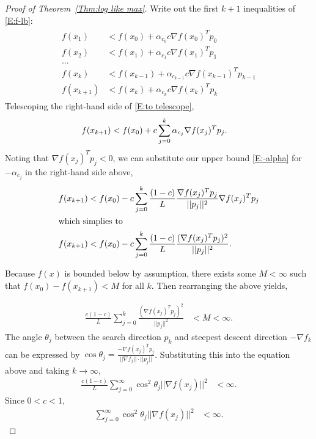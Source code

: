 \documentclass[oneside]{myumnStatThesis}
\begin{document}
\begin{proof}[Proof of Theorem~\ref{Thm:log like max}]
Write out the first $k+1$ inequalities of \eqref{E:f-lb}:
\begin{align}
\begin{split}
	f( x_1 ) &< f(x_0) + \alpha_{c_0} c \nabla f(x_0)^T p_0 \\
	f( x_2 ) &< f(x_1) + \alpha_{c_1} c \nabla f(x_1)^T p_1  \\
	\ldots  \\
	f( x_{k} ) &< f(x_{k-1}) + \alpha_{c_{k-1}} c \nabla f(x_{k-1})^T p_{k-1}  \\
	f( x_{k+1} ) &< f(x_k) + \alpha_{c_k} c \nabla f(x_k)^T p_k 
\end{split}
	\label{E:to telescope}
\end{align}
Telescoping the right-hand side of \eqref{E:to telescope},
\begin{align*}
	f( x_{k+1} ) &< f(x_0) + c \sum_{j=0}^{k} \alpha_{c_j} \nabla f(x_j)^T p_j. \notag
\end{align*}
Noting that $\nabla f(x_j)^T p_j < 0$, we can substitute our upper bound \eqref{E:-alpha} for $-\alpha_{c_j}$ in the 
right-hand side above,
\begin{align}
	f( x_{k+1} ) &< f(x_0) - c \sum_{j=0}^{k} \frac{( 1 - c )}{L} \frac{ \nabla f(x_j)^T p_j}{ || p_j ||^2 } \nabla f
(x_j)^T p_j \notag \\
	\intertext{which simplies to}
	f( x_{k+1} ) &< f(x_0) - c \sum_{j=0}^{k} \frac{( 1 - c )}{L} \frac{ (\nabla f(x_j)^T p_j)^2}{ || p_j ||^2 }. 
\notag
\end{align}

Because $f(x)$ is bounded below by assumption, there exists some $M < \infty$ such that $f(x_0) - f(x_{k+1}) < M$ for 
all $k$. Then rearranging the above yields,

\begin{align*}
	\frac{c( 1 - c )}{L} \sum_{j=0}^{k}   \frac{ ( \nabla f(x_j)^T p_j )^2}{ || p_j ||^2 } &< M < \infty.
 \end{align*}
The angle $\theta_j$ between the search direction $p_k$ and steepest descent direction $-\nabla f_k$ can be expressed 
by $\cos \theta_j = \frac{ -\nabla f(x_j)^T p_j}{||\nabla f_j|| \cdot || p_j||}$.  Substituting this into the equation 
above and taking $k \to \infty$,
\begin{align*}
	\frac{c( 1 - c )}{L} \sum_{j=0}^{\infty}  \cos^2 \theta_j ||\nabla f(x_j)||^2 &< \infty.
\end{align*}
Since $0 < c < 1$,
\begin{align}
	\sum_{j=0}^{\infty}  \cos^2 \theta_j ||\nabla f(x_j)||^2 &< \infty. \label{E:Z's}
\end{align}


\end{proof}
\end{document}

